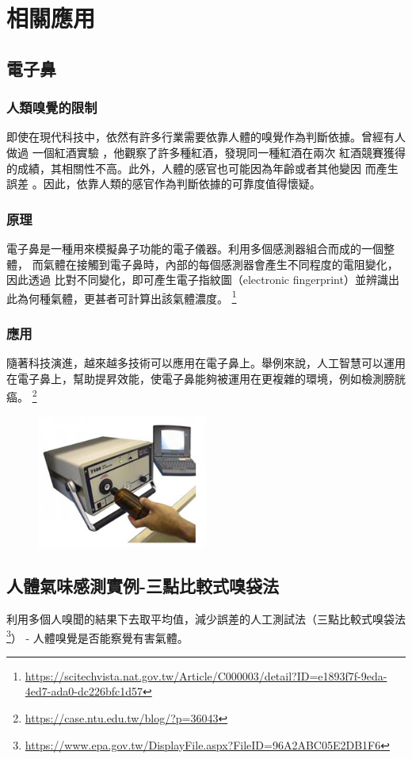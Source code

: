 \chapter{相關應用}

\section{電子鼻}
\subsection{人類嗅覺的限制}
即使在現代科技中，依然有許多行業需要依靠人體的嗅覺作為判斷依據。曾經有人做過
一個紅酒實驗 \cite{hodgson_2008} ，他觀察了許多種紅酒，發現同一種紅酒在兩次
紅酒競賽獲得的成績，其相關性不高。此外，人體的感官也可能因為年齡或者其他變因
而產生誤差 \cite{Hugh2015} 。因此，依靠人類的感官作為判斷依據的可靠度值得懷疑。
\subsection{原理}
電子鼻是一種用來模擬鼻子功能的電子儀器。利用多個感測器組合而成的一個整體，
而氣體在接觸到電子鼻時，內部的每個感測器會產生不同程度的電阻變化，因此透過
比對不同變化，即可產生電子指紋圖（electronic fingerprint）並辨識出
此為何種氣體，更甚者可計算出該氣體濃度。 \footnote{\url{https://scitechvista.nat.gov.tw/Article/C000003/detail?ID=e1893f7f-9eda-4ed7-ada0-dc226bfc1d57}}
\subsection{應用}
隨著科技演進，越來越多技術可以應用在電子鼻上。舉例來說，人工智慧可以運用
在電子鼻上，幫助提昇效能，使電子鼻能夠被運用在更複雜的環境，例如檢測膀胱癌。 \footnote{\url{https://case.ntu.edu.tw/blog/?p=36043}}
\begin{figure}[H]
	\centering
	\includegraphics[width=0.5\textwidth]{../../pic/nose.png}
\end{figure}

\section{人體氣味感測實例-三點比較式嗅袋法}
利用多個人嗅聞的結果下去取平均值，減少誤差的人工測試法（三點比較式嗅袋法\footnote{\url{https://www.epa.gov.tw/DisplayFile.aspx?FileID=96A2ABC05E2DB1F6}}）
- 人體嗅覺是否能察覺有害氣體。

